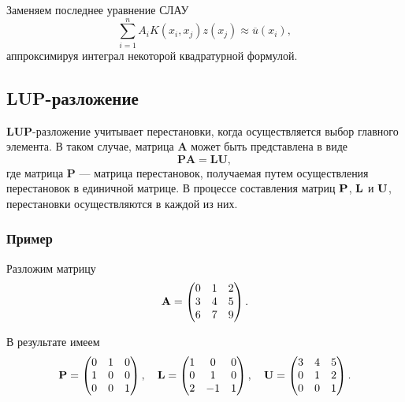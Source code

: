 \documentclass[12pt]{article}
\begin{document}
	Заменяем последнее уравнение СЛАУ
	\begin{equation}
		\sum_{i=1}^{n}A_i K\left(x_i,x_j\right)z\left(x_j\right)\approx\overline{u}\left(x_i\right),
	\end{equation}
	аппроксимируя интеграл некоторой квадратурной формулой.
		
	\subsection*{LUP-разложение}
	
	\textbf{LUP}-разложение учитывает перестановки, когда осуществляется выбор главного элемента. В таком случае, матрица $\textbf{A}$ может быть представлена в виде
	\begin{equation}
		\textbf{PA}=\textbf{LU},
	\end{equation}
	где матрица $\textbf{P}$ --- матрица перестановок, получаемая путем осуществления перестановок в единичной матрице. В процессе составления матриц $\bold{P}$, $\bold{L}$ и $\bold{U}$, перестановки осуществляются в каждой из них.
	
	\subsubsection*{Пример}
	Разложим матрицу
	\begin{equation}
		\bold{A}=\begin{pmatrix}
			0 & 1 & 2 \\
			3 & 4 & 5 \\
			6 & 7 & 9 \\
		\end{pmatrix}.
	\end{equation}
	
	В результате имеем
	\begin{equation}
		\bold{P}=
		\begin{pmatrix}
			0 & 1 & 0 \\
			1 & 0 & 0 \\
			0 & 0 & 1 \\
		\end{pmatrix},\quad
		\bold{L}=
		\begin{pmatrix}
			1 & 0 & 0 \\
			0 & 1 & 0 \\
			2 & -1 & 1 \\
		\end{pmatrix},\quad
		\bold{U}=
		\begin{pmatrix}
			3 & 4 & 5 \\
			0 & 1 & 2 \\
			0 & 0 & 1 \\
		\end{pmatrix}.
	\end{equation}
	
\end{document}

